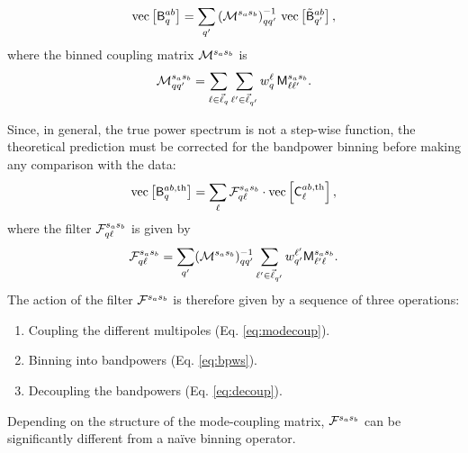 \documentclass[usenatbib]{mnrasb}
\begin{document}
        \begin{equation}\label{eq:decoup}
          {\rm vec}\left[{\sf B}^{ab}_q\right]=\sum_{q'}\left({\cal M}^{s_as_b}\right)^{-1}_{qq'}\,{\rm vec}\left[\tilde{\sf B}^{ab}_{q'}\right],
        \end{equation}
        where the binned coupling matrix ${\cal M}^{s_as_b}$ is
        \begin{equation}
          {\cal M}^{s_as_b}_{qq'}=\sum_{\ell\in\vec{\ell}_q}\sum_{\ell'\in\vec{\ell}_{q'}}w_q^\ell\,{\sf M}^{s_as_b}_{\ell\ell'}.
        \end{equation}
      
        Since, in general, the true power spectrum is not a step-wise function, the theoretical prediction must be corrected for the bandpower binning before making any comparison with the data:
        \begin{equation}\label{eq:theory_correct}
          {\rm vec}\left[{\sf B}^{ab,{\rm th}}_q\right]=\sum_{\ell}{\cal F}^{s_as_b}_{q\ell}\cdot{\rm vec}\left[{\sf C}^{ab,{\rm th}}_\ell\right],
        \end{equation}
        where the filter ${\cal F}^{s_as_b}_{q\ell}$ is given by
        \begin{equation}\label{eq:bpresponse}
          {\cal F}^{s_as_b}_{q\ell}=\sum_{q'}({\cal M}^{s_as_b})^{-1}_{qq'}\sum_{\ell'\in\vec{\ell}_{q'}}w_{q'}^{\ell'}{\sf M}^{s_as_b}_{\ell'\ell}.
        \end{equation}
        The action of the filter ${\cal F}^{s_as_b}$ is therefore given by a sequence of three operations:
        \begin{enumerate}
          \item Coupling the different multipoles (Eq. \ref{eq:modecoup}).
          \item Binning into bandpowers (Eq. \ref{eq:bpws}).
          \item Decoupling the bandpowers (Eq. \ref{eq:decoup}).
        \end{enumerate}
        Depending on the structure of the mode-coupling matrix, ${\cal F}^{s_as_b}$ can be significantly different from a na\"ive binning operator.
        
\end{document}
